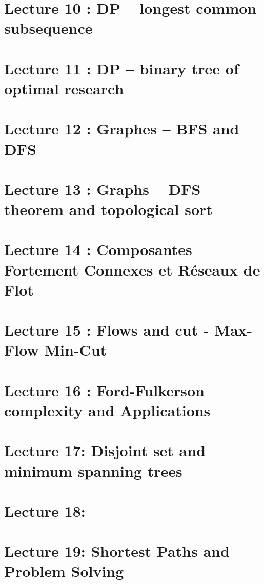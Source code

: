 \documentclass[a4paper,11pt]{article}
\begin{document}
\section{Lecture 10 : DP – longest common subsequence}


\section{Lecture 11 : DP – binary tree of optimal research}


\section{Lecture 12 : Graphes – BFS and DFS}


\section{Lecture 13 : Graphs – DFS theorem and topological sort}


\section{Lecture 14 : Composantes Fortement Connexes et Réseaux de Flot}


\section{Lecture 15 : Flows and cut - Max-Flow Min-Cut}


\section{Lecture 16 : Ford-Fulkerson complexity and Applications}


\section{Lecture 17: Disjoint set and minimum spanning trees}
 

 \section{Lecture 18: }
 

 \section{Lecture 19: Shortest Paths and Problem Solving}

\end{document}
